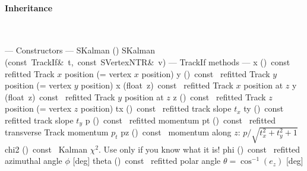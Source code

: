 \documentclass{article}
\begin{document}
\begin{cxxentry}
\begin{cxxclass}
\begin{cxxInheritance}
\paragraph{Inheritance}\strut\smallskip\strut\\
\end{cxxInheritance}
\begin{cxxpublic}
\cxxitem{}
        {--- Constructors --- }
        {}
        {}
        {}
\label{cxx.2.2.1}
\cxxitem{}
        {SKalman}
        {()}
        {}
        {}
\label{cxx.2.2.2}
\cxxitem{}
        {SKalman}
        {(const\ TrackIf\&\ t,\ const\ SVertex\<NTR\>\&\ v)}
        {}
        {}
\label{cxx.2.2.3}
\cxxitem{}
        {--- TrackIf methods --- }
        {}
        {}
        {}
\label{cxx.2.2.4}
        {x}
        {()\ const\ }
        { refitted Track $x$ position (= vertex $x$ position)}
        {}
\label{cxx.2.2.5}
        {y}
        {()\ const\ }
        { refitted Track $y$ position (= vertex $y$ position)}
        {}
\label{cxx.2.2.6}
        {x}
        {(float\ z)\ const\ }
        { refitted Track $x$ position at $z$}
        {}
\label{cxx.2.2.7}
        {y}
        {(float\ z)\ const\ }
        { refitted Track $y$ position at $z$}
        {}
\label{cxx.2.2.8}
        {z}
        {()\ const\ }
        { refitted Track $z$ position (= vertex $z$ position)}
        {}
\label{cxx.2.2.9}
        {tx}
        {()\ const\ }
        { refitted track slope $t_x$}
        {}
\label{cxx.2.2.10}
        {ty}
        {()\ const\ }
        { refitted track slope $t_y$}
        {}
\label{cxx.2.2.11}
        {p}
        {()\ const\ }
        { refitted momentum}
        {}
\label{cxx.2.2.12}
        {pt}
        {()\ const\ }
        { refitted transverse Track momentum $p_t$}
        {}
\label{cxx.2.2.13}
        {pz}
        {()\ const\ }
        { momentum along $z$: $p / \sqrt{t_x^2+t_y^2+1}$ }
        {}
\label{cxx.2.2.14}
        {chi2}
        {()\ const\ }
        { Kalman $\chi^2$. Use only if you know what it is!}
        {}
\label{cxx.2.2.15}
        {phi}
        {()\ const\ }
        { refitted azimuthal angle $\phi$ [deg]}
        {}
\label{cxx.2.2.16}
        {theta}
        {()\ const\ }
        { refitted polar angle $\theta = \cos^{-1}(e_z)$ [deg]}

\end{cxxpublic}
\end{cxxclass}
\end{cxxentry}
\end{document}
